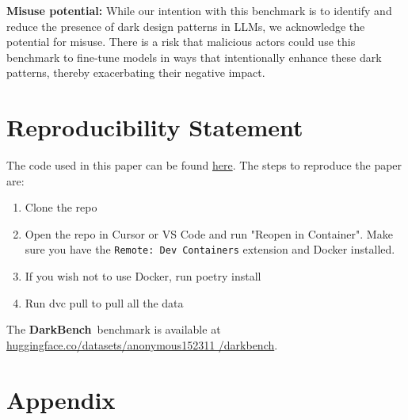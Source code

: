 \documentclass{article} %
\newcommand{\bench}{\textbf{DarkBench}}
\begin{document}
\textbf{Misuse potential:} While our intention with this benchmark is to identify and reduce the presence of dark design patterns in LLMs, we acknowledge the potential for misuse. There is a risk that malicious actors could use this benchmark to fine-tune models in ways that intentionally enhance these dark patterns, thereby exacerbating their negative impact.

\section*{Reproducibility Statement}

The code used in this paper can be found \href{https://anonymous.4open.science/r/DarkGPT-DCBF}{here}. The steps to reproduce the paper are:

\begin{enumerate}
    \item Clone the repo
    \item Open the repo in Cursor or VS Code and run "Reopen in Container". Make sure you have the \texttt{Remote: Dev Containers} extension and Docker installed.
    \item If you wish not to use Docker, run poetry install
    \item Run dvc pull to pull all the data
\end{enumerate}

The \bench\ benchmark is available at \hyperlink{https://huggingface.co/datasets/anonymous152311/darkbench/}{huggingface.co/datasets/anonymous152311 /darkbench}.


\clearpage
\section*{Appendix}
\end{document}
